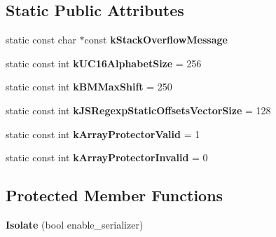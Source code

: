 \subsection*{Static Public Attributes}
\begin{DoxyCompactItemize}
\item 
static const char $\ast$const {\bfseries k\+Stack\+Overflow\+Message}
\item 
static const int {\bfseries k\+U\+C16\+Alphabet\+Size} = 256\hypertarget{classv8_1_1internal_1_1_isolate_a3af6e148b51e8342a70d3c06e9cb837f}{}\label{classv8_1_1internal_1_1_isolate_a3af6e148b51e8342a70d3c06e9cb837f}

\item 
static const int {\bfseries k\+B\+M\+Max\+Shift} = 250\hypertarget{classv8_1_1internal_1_1_isolate_a3d909a4000f32615b675f2007878d3fa}{}\label{classv8_1_1internal_1_1_isolate_a3d909a4000f32615b675f2007878d3fa}

\item 
static const int {\bfseries k\+J\+S\+Regexp\+Static\+Offsets\+Vector\+Size} = 128\hypertarget{classv8_1_1internal_1_1_isolate_ae21f1b76aadb93d7e1ac1c9eaaf07b6e}{}\label{classv8_1_1internal_1_1_isolate_ae21f1b76aadb93d7e1ac1c9eaaf07b6e}

\item 
static const int {\bfseries k\+Array\+Protector\+Valid} = 1\hypertarget{classv8_1_1internal_1_1_isolate_ab1cae6cbcfa66ed9eefdd994d0c081c5}{}\label{classv8_1_1internal_1_1_isolate_ab1cae6cbcfa66ed9eefdd994d0c081c5}

\item 
static const int {\bfseries k\+Array\+Protector\+Invalid} = 0\hypertarget{classv8_1_1internal_1_1_isolate_ade465a3a0862ea48cb89f969ccc5d8a5}{}\label{classv8_1_1internal_1_1_isolate_ade465a3a0862ea48cb89f969ccc5d8a5}

\end{DoxyCompactItemize}
\subsection*{Protected Member Functions}
\begin{DoxyCompactItemize}
\item 
{\bfseries Isolate} (bool enable\+\_\+serializer)\hypertarget{classv8_1_1internal_1_1_isolate_aed119a6885456e3d7f8e89deb3f2c959}{}\label{classv8_1_1internal_1_1_isolate_aed119a6885456e3d7f8e89deb3f2c959}

\end{DoxyCompactItemize}
